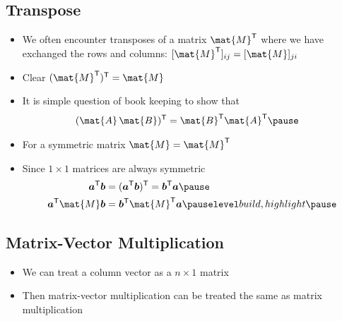 
\begin{slide}
\section[-2]{Transpose}

\begin{PauseHighLight}
  \begin{itemize}
  \item We often encounter transposes of a matrix $\mat{M}^\tr$ where
    we have exchanged the rows and columns: $[\mat{M}^\tr]_{ij} =
    [\mat{M}]_{ji}$\pause
  \item Clear $(\mat{M}^\tr)^\tr = \mat{M}$\pause
  \item It is simple question of book keeping to show that
    \begin{align*}
      (\mat{A}\,\mat{B})^\tr &= \mat{B}^\tr \mat{A}^\tr\pause
    \end{align*}
  \item For a symmetric matrix $\mat{M} = \mat{M}^\tr$\pause
  \item Since $1\times 1$ matrices are always symmetric
    \begin{align*}
      \bm{a}^\tr \bm{b} &= (\bm{a}^\tr \bm{b})^\tr = \bm{b}^\tr
                          \bm{a}\pause\\
      \bm{a}^\tr \mat{M} \bm{b} &= \bm{b}^\tr \mat{M}^\tr \bm{a}\pauseb
    \end{align*}
  \end{itemize}
\end{PauseHighLight}

\end{slide}



\begin{slide}
\section{Matrix-Vector Multiplication}
\pb
\begin{itemize}
\item We can treat a column vector as a $n\times 1$ matrix\pause
\item Then matrix-vector multiplication can be treated the same as
  matrix multiplication\pause
  \begin{center}
    \pause
  \end{center}
  
\end{itemize}

\end{slide}

